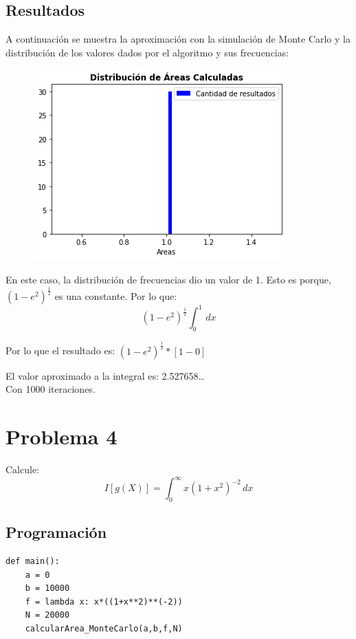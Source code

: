 \documentclass[a4paper,12pt]{article}
\newcommand{\eq}[1]{$#1$}
\begin{document}
    \subsection{Resultados}
    A continuación se muestra la aproximación con la simulación de Monte Carlo y 
    la distribución de los valores dados por el algoritmo y sus frecuencias:
    \begin{figure}[h]
        \centering
        \includegraphics[width=\textwidth]{ejer3_v2.png}
    \end{figure}
    
    En este caso, la distribución de frecuencias dio un valor de 1.
    Esto es porque, \eq{(1-e^2)^{\frac{1}{2}}} es una constante.
    Por lo que:
    \begin{equation}
        (1-e^2)^{\frac{1}{2}} \int_{0}^{1} \,dx
    \end{equation}

    Por lo que el resultado es: \eq{(1-e^2)^{\frac{1}{2}}*[1-0]}

    El valor aproximado a la integral es: 2.527658\ldots\\
    Con 1000 iteraciones.
    \section{Problema 4}
    Calcule:
    \begin{equation}
        I[g(X)] = \int_{0}^{\infty} x(1 + x^2)^{-2} \,dx
    \end{equation}
    \subsection{Programación}
\begin{lstlisting}
def main():
    a = 0
    b = 10000
    f = lambda x: x*((1+x**2)**(-2))
    N = 20000
    calcularArea_MonteCarlo(a,b,f,N)
\end{lstlisting}
\end{document}
